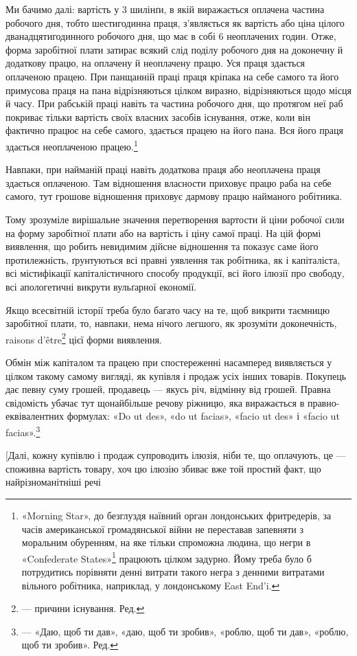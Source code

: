 Ми бачимо далі: вартість у 3 шилінґи, в якій виражається
оплачена частина робочого дня, тобто шестигодинна праця,
з’являється як вартість або ціна цілого дванадцятигодинного
робочого дня, що має в собі 6 неоплачених годин. Отже, форма
заробітної плати затирає всякий слід поділу робочого дня на
доконечну й додаткову працю, на оплачену й неоплачену працю.
Уся праця здається оплаченою працею. При панщанній праці
праця кріпака на себе самого та його примусова праця на пана
відрізняються цілком виразно, відрізняються щодо місця й часу.
При рабській праці навіть та частина робочого дня, що протягом
неї раб покриває тільки вартість своїх власних засобів існування,
отже, коли він фактично працює на себе самого, здається працею
на його пана. Вся його праця здається неоплаченою працею.\footnote{
«Morning Star», до безглуздя наївний орган лондонських фритредерів,
за часів американської громадянської війни не переставав запевняти
з моральним обуренням, на яке тільки спроможна людина, що
негри в «Confederate States»\footnote*{
— південних штатах. Ред.
} працюють цілком задурно. Йому треба
було б потрудитись порівняти денні витрати такого негра з денними витратами
вільного робітника, наприклад, у лондонському East End'i.
}

Навпаки, при найманій праці навіть додаткова праця або
неоплачена праця здається оплаченою. Там відношення власности
приховує працю раба на себе самого, тут грошове відношення
приховує дармову працю найманого робітника.

Тому зрозуміле вирішальне значення перетворення вартости
й ціни робочої сили на форму заробітної плати або на вартість
і ціну самої праці. На цій формі виявлення, що робить невидимим
дійсне відношення та показує саме його протилежність,
ґрунтуються всі правні уявлення так робітника, як і капіталіста,
всі містифікації капіталістичного способу продукції, всі
його ілюзії про свободу, всі апологетичні викрути вульґарної
економії.

Якщо всесвітній історії треба було багато часу на те, щоб
викрити таємницю заробітної плати, то, навпаки, нема нічого
легшого, як зрозуміти доконечність, raisons d’être\footnote*{
— причини існування. Ред.
} цієї форми
виявлення.

Обмін між капіталом та працею при спостереженні насамперед
виявляється у цілком такому самому вигляді, як купівля
і продаж усіх інших товарів. Покупець дає певну суму грошей,
продавець — якусь річ, відмінну від грошей. Правна свідомість
убачає тут щонайбільше речову ріжницю, яка виражається
в правно-еквівалентних формулах: «Do ut des», «do ut facias»,
«facio ut des» і «facio ut facias».\footnote*{
— «Даю, щоб ти дав», «даю, щоб ти зробив», «роблю, щоб ти дав»,
«роблю, щоб ти зробив». Ред.
}

[Далі, кожну купівлю і продаж супроводить ілюзія, ніби
те, що оплачують, це — споживна вартість товару, хоч цю ілюзію
збиває вже той простий факт, що найрізноманітніші речі
\parbreak{}  %
